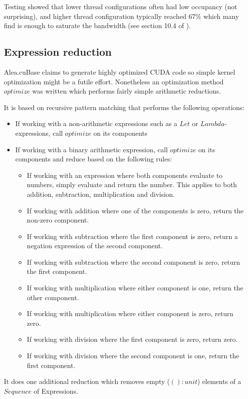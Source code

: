 Testing showed that lower thread configurations often had low occupancy (not surprising), and higher thread configuration typically reached 67\% which many find is enough to saturate the bandwidth (see section 10.4 of \cite{cudacoccupancy}).

\subsection{Expression reduction}\label{subsec:exprReduction}
Alea.cuBase claims to generate highly optimized CUDA code so simple kernel optimization might be a futile effort.
Nonetheless an optimization method $optimize$ was written which performs fairly simple arithmetic reductions.

It is based on recursive pattern matching that performs the following operations:
\begin{itemize}
\item If working with a non-arithmetic expressions such as a $Let$ or $Lambda$-expressions, call $optimize$ on its components
\item If working with a binary arithmetic expression, call $optimize$ on its components and reduce based on the following rules:
	\begin{itemize}
	\item If working with an expression where both components evaluate to numbers, simply evaluate and return the number. This applies to both addition, subtraction, multiplication and division.
	\item If working with addition where one of the components is zero, return the non-zero component.
	\item If working with subtraction where the first component is zero, return a negation expression of the second component.
	\item If working with subtraction where the second component is zero, return the first component.
	\item If working with multiplication where either component is one, return the other component.
	\item If working with multiplication where either component is zero, return zero.
	\item If working with division where the first component is zero, return zero.
	\item If working with division where the second component is one, return the first component.
	\end{itemize}
\end{itemize}
It does one additional reduction which removes empty ($() : unit$) elements of a $Sequence$ of Expressions.

